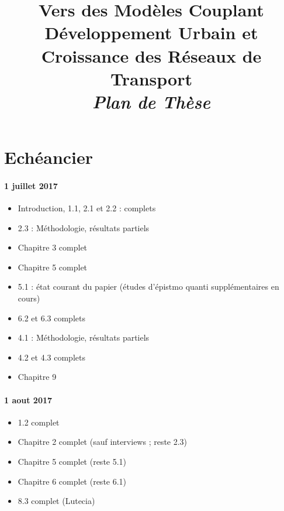 




\title{Vers des Modèles Couplant Développement Urbain et Croissance des Réseaux de Transport\bigskip\\
\textit{Plan de Thèse}
}
\author{}


\maketitle

\justify


\begin{abstract}
\end{abstract}


\section*{Echéancier}

\paragraph{1 juillet 2017}

\begin{itemize}
\item Introduction, 1.1, 2.1 et 2.2 : complets
\item 2.3 : Méthodologie, résultats partiels
\item Chapitre 3 complet
\item Chapitre 5 complet
\item 5.1 : état courant du papier \cite{antelope2016interdisciplinary} (études d'épistmo quanti supplémentaires en cours)
\item 6.2 et 6.3 complets
\item 4.1 : Méthodologie, résultats partiels
\item 4.2 et 4.3 complets
\item Chapitre 9
\end{itemize}



\paragraph{1 aout 2017}

\begin{itemize}
\item 1.2 complet
\item Chapitre 2 complet (sauf interviews ; reste 2.3)
\item Chapitre 5 complet (reste 5.1)
\item Chapitre 6 complet (reste 6.1)
\item 8.3 complet (Lutecia)
\end{itemize}

